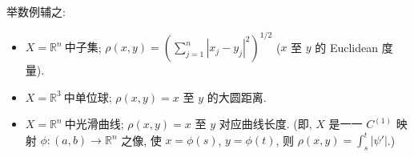\documentclass[twoside, fontset=fandol, punct=kaiming]{ctexbook}
\theoremstyle{innocent}
\begin{document}
举数例辅之:
\begin{itemize}
    \item $X=\mathbb R^n~\textit{中子集}$; $\rho (x,y) = (\sum_{j=1}^n|x_j-y_j|^2)^{1 /2}$ ($x$ 至 $y$ 的 Euclidean 度量).
    \item $X=\mathbb R^3~\textit{中单位球}$; $\rho (x,y) = \text{$x$ 至 $y$ 的大圆距离}$.
    \item $X=\mathbb R^n~\textit{中光滑曲线}$; $\rho (x,y) = \text{$x$ 至 $y$ 对应曲线长度}$. (即, $X$ 是一一 $C^{(1)}$ 映射 $\phi :(a,b)\to \mathbb R^n$ 之像, 使 $x=\phi (s)$, $y=\phi (t)$, 则 $\rho (x,y)=\int_s^t|\psi '|$.)
\end{itemize}




\end{document}
